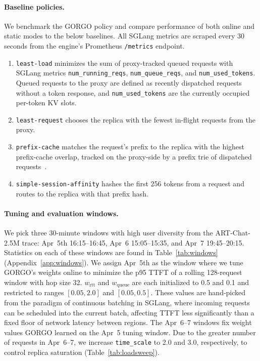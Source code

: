 \documentclass{article}
\begin{document}
\paragraph{Baseline policies.}
We benchmark the GORGO policy and compare performance of both online and static
modes to the below baselines. All SGLang metrics are scraped every 30 seconds
from the engine's Prometheus \texttt{/metrics} endpoint.
\begin{enumerate}
\item \texttt{least-load} minimizes the sum of proxy-tracked queued requests with
  SGLang metrics \texttt{num\_running\_reqs}, \texttt{num\_queue\_reqs}, and
  \texttt{num\_used\_tokens}. Queued requests to the proxy are defined as recently
  dispatched requests without a token response, and \texttt{num\_used\_tokens} are
  the currently occupied per-token KV slots.
\item \texttt{least-request} chooses the replica with the fewest in-flight
  requests from the proxy.
\item \texttt{prefix-cache} matches the request's prefix to the replica with the
  highest prefix-cache overlap, tracked on the proxy-side by a prefix trie of
  dispatched requests~\citep{aibrix2024}.
\item \texttt{simple-session-affinity} hashes the first 256 tokens from a request
  and routes to the replica with that prefix hash.
\end{enumerate}

\paragraph{Tuning and evaluation windows.}
We pick three 30-minute windows with high user diversity from the ART-Chat-2.5M
trace: Apr~5th 16:15--16:45, Apr~6 15:05--15:35, and Apr~7 19:45--20:15.
Statistics on each of these windows are found in Table~\ref{tab:windows}
(Appendix~\ref{app:windows}). We
assign Apr~5th as the window where we tune GORGO's weights online to minimize the
p95 TTFT of a rolling 128-request window with hop size 32. $w_{\mathrm{rtt}}$ and
$w_{\mathrm{queue}}$ are each initialized to 0.5 and 0.1 and restricted to ranges
$[0.05, 2.0]$ and $[0.05, 0.5]$. These values are hand-picked from the paradigm
of continuous batching in SGLang, where incoming requests can be scheduled into
the current batch, affecting TTFT less significantly than a fixed floor of
network latency between regions. The Apr~6--7 windows fix weight values GORGO
learned on the Apr~5 tuning window. Due to the greater number of requests in
Apr~6--7, we increase \texttt{time\_scale} to 2.0 and 3.0, respectively, to
control replica saturation (Table~\ref{tab:loadsweep}).
\end{document}
